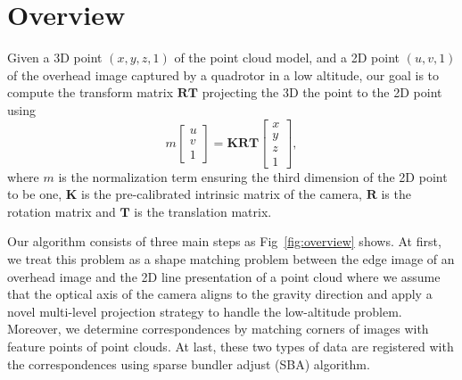 %
%
\section{Overview}
Given a 3D point $(x,y,z,1)$ of the point cloud model, and a 2D point $(u,v,1)$ of the overhead image captured by a quadrotor in a low altitude, our goal is to compute the transform matrix $\mathbf{RT}$ projecting the 3D the point to the 2D point using 
%
\begin{equation} \label{eq:problem}
m\begin{bmatrix}
u\\v\\1
\end{bmatrix}
= \mathbf{K} \mathbf{RT}
\begin{bmatrix}
x\\y\\z\\1
\end{bmatrix},
\end{equation}
%
where $m$ is the normalization term ensuring the third dimension of the 2D point to be one, $\mathbf{K}$ is the pre-calibrated intrinsic matrix of the camera, $\mathbf{R}$ is the rotation matrix and $\mathbf{T}$ is the translation matrix.

Our algorithm consists of three main steps as Fig~\ref{fig:overview} shows. At first, we treat this problem as a shape matching problem between the edge image of an overhead image and the 2D line presentation of a point cloud where we assume that the optical axis of the camera aligns to the gravity direction and apply a novel multi-level projection strategy to handle the low-altitude problem. Moreover, we determine correspondences by matching corners of images with feature points of point clouds. At last, these two types of data are registered with the correspondences using sparse bundler adjust (SBA) algorithm.


%
%
